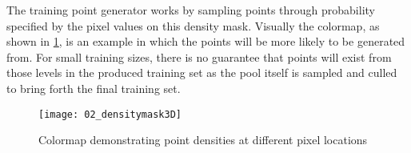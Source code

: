 The training point generator works by sampling points through probability specified by the pixel values on this density mask. Visually the colormap, as shown in \ref{fig:02_densitymask3D}, is an example in which the points will be more likely to be generated from. For small training sizes, there is no guarantee that points will exist from those levels in the produced training set as the pool itself is sampled and culled to bring forth the final training set.

\begin{figure}[p]
    \centering
    \texttt{[image: 02\_densitymask3D]}
    \caption{Colormap demonstrating point densities at different pixel locations}
    \label{fig:02_densitymask3D}
\end{figure}


